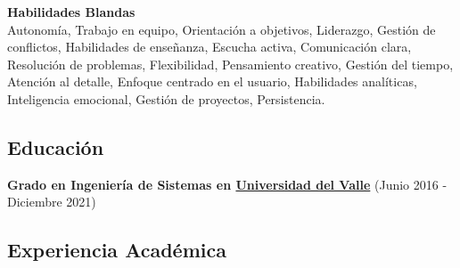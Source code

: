   \vspace*{0.2cm}
  \textbf{Habilidades Blandas}\\
  Autonomía, Trabajo en equipo, Orientación a objetivos, Liderazgo, Gestión de conflictos, Habilidades de enseñanza, Escucha activa, Comunicación clara, Resolución de problemas, Flexibilidad, Pensamiento creativo, Gestión del tiempo, Atención al detalle, Enfoque centrado en el usuario, Habilidades analíticas, Inteligencia emocional, Gestión de proyectos, Persistencia.
  
  \subsection*{Educación}
  \vspace*{0.2cm}
  \textbf{Grado en Ingeniería de Sistemas en \href{https://www.univalle.edu.co/}{Universidad del Valle}} \hfill (Junio 2016 - Diciembre 2021)

  \noindent\makebox[\linewidth]{\rule{\textwidth}{0.4pt}}

  \subsection*{Experiencia Académica}
  \vspace*{0.2cm}

